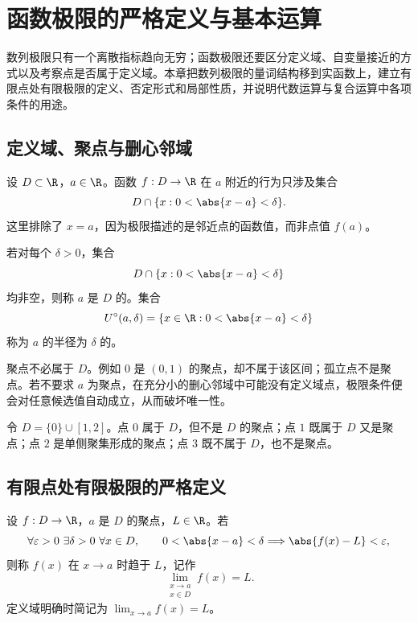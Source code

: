 \chapter{函数极限的严格定义与基本运算}
\label{chap:function-limit-definition}

\begin{chapterguide}
数列极限只有一个离散指标趋向无穷；函数极限还要区分定义域、自变量接近的方式以及考察点是否属于定义域。本章把数列极限的量词结构移到实函数上，建立有限点处有限极限的定义、否定形式和局部性质，并说明代数运算与复合运算中各项条件的用途。
\end{chapterguide}

\section{定义域、聚点与删心邻域}

设 \(D\subset\R\)，\(a\in\R\)。函数 \(f:D\to\R\) 在 \(a\) 附近的行为只涉及集合
\[
 D\cap\{x:0<\abs{x-a}<\delta\}.
\]
这里排除了 \(x=a\)，因为极限描述的是邻近点的函数值，而非点值 \(f(a)\)。

\begin{definition}[聚点]
若对每个 \(\delta>0\)，集合
\[
 D\cap\{x:0<\abs{x-a}<\delta\}
\]
均非空，则称 \(a\) 是 \(D\) 的。集合
\[
 U^\circ(a,\delta)=\{x\in\R:0<\abs{x-a}<\delta\}
\]
称为 \(a\) 的半径为 \(\delta\) 的。
\end{definition}

聚点不必属于 \(D\)。例如 \(0\) 是 \((0,1)\) 的聚点，却不属于该区间；孤立点不是聚点。若不要求 \(a\) 为聚点，在充分小的删心邻域中可能没有定义域点，极限条件便会对任意候选值自动成立，从而破坏唯一性。

\begin{example}
令 \(D=\{0\}\cup[1,2]\)。点 \(0\) 属于 \(D\)，但不是 \(D\) 的聚点；点 \(1\) 既属于 \(D\) 又是聚点；点 \(2\) 是单侧聚集形成的聚点；点 \(3\) 既不属于 \(D\)，也不是聚点。
\end{example}

\section{有限点处有限极限的严格定义}

\begin{definition}[函数极限]
设 \(f:D\to\R\)，\(a\) 是 \(D\) 的聚点，\(L\in\R\)。若
\[
 \forall\varepsilon>0\ \exists\delta>0\ \forall x\in D,\qquad
 0<\abs{x-a}<\delta\Longrightarrow\abs{f(x)-L}<\varepsilon,
\]
则称 \(f(x)\) 在 \(x\to a\) 时趋于 \(L\)，记作
\[
 \lim_{\substack{x\to a\\x\in D}}f(x)=L.
\]
定义域明确时简记为 \(\lim_{x\to a}f(x)=L\)。
\end{definition}


